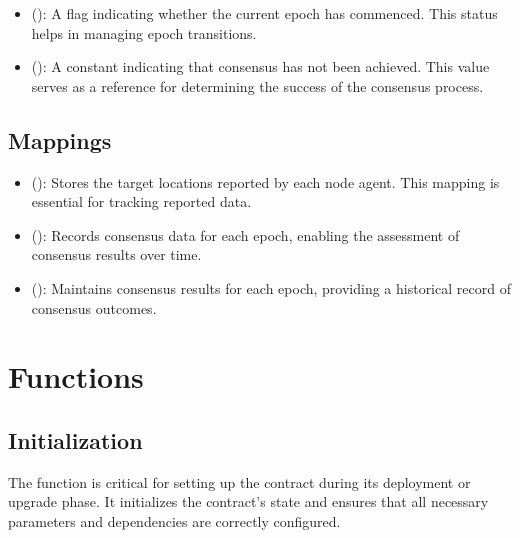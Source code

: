 \documentclass[a4paper,10pt,english]{sphinxmanual}
\begin{document}
\begin{itemize}
\item {} 
\sphinxAtStartPar
{} ():
A flag indicating whether the current epoch has commenced. This status helps in managing epoch transitions.

\item {} 
\sphinxAtStartPar
{} ():
A constant indicating that consensus has not been achieved. This value serves as a reference for determining the success of the consensus process.

\end{itemize}


\subsection{Mappings}
\label{\detokenize{docs_consensus_mechanism_contract:mappings}}\begin{itemize}
\item {} 
\sphinxAtStartPar
{} ():
Stores the target locations reported by each node agent. This mapping is essential for tracking reported data.

\item {} 
\sphinxAtStartPar
{} ():
Records consensus data for each epoch, enabling the assessment of consensus results over time.

\item {} 
\sphinxAtStartPar
{} ():
Maintains consensus results for each epoch, providing a historical record of consensus outcomes.

\end{itemize}


\section{Functions}
\label{\detokenize{docs_consensus_mechanism_contract:functions}}

\subsection{Initialization}
\label{\detokenize{docs_consensus_mechanism_contract:initialization}}
\sphinxAtStartPar
The  function is critical for setting up the contract during its deployment or upgrade phase. It initializes the contract’s state and ensures that all necessary parameters and dependencies are correctly configured.
\end{document}
